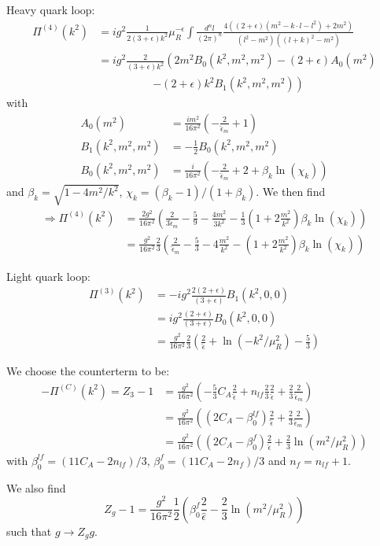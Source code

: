 Heavy quark loop:
\begin{align}
\Pi^{(4)}(k^2) &= ig^2\frac {1} {2(3+\epsilon)k^2}\mu_R^{-\epsilon}\!\!\int\!\!\frac{d^nl}{(2\pi)^n} \frac{4((2+\epsilon)(m^2-k\cdot l - l^2)+2m^2)}{(l^2-m^2)((l+k)^2-m^2)}\\
 &= ig^2\frac {2}{(3+\epsilon)k^2}\left(2m^2B_0(k^2,m^2,m^2)-(2+\epsilon)A_0(m^2)\right.\nonumber\\
 &\hspace{60pt}\left.-(2+\epsilon)k^2B_1(k^2,m^2,m^2)\right)
\end{align}
with
\begin{align}
A_0(m^2) &= \frac {i m^2}{16\pi^2}\left(-\frac 2 {\hat \epsilon_m} + 1 \right)\\
B_1(k^2,m^2,m^2) &= -\frac 1 2 B_0(k^2,m^2,m^2)\\
B_0(k^2,m^2,m^2) &= \frac i {16\pi^2}\left(-\frac 2 {\hat \epsilon_m} + 2 + \beta_k\ln(\chi_k) \right)
\end{align}
and $\beta_k=\sqrt{1-4m^2/k^2}$, $\chi_k=(\beta_k-1)/(1+\beta_k)$. We then find
\begin{align}
\Rightarrow \Pi^{(4)}(k^2) &= \frac {2g^2}{16\pi^2}\left(\frac 2 {3\hat \epsilon_m}-\frac 5 9 -\frac{4m^2}{3k^2} - \frac 1 3 \left(1+2\frac{m^2}{k^2}\right)\beta_k\ln(\chi_k)\right)\\
&= \frac {g^2}{16\pi^2}\frac 2 3\left(\frac 2 {\hat \epsilon_m}-\frac 5 3 -4\frac{m^2}{k^2} - \left(1+2\frac{m^2}{k^2}\right)\beta_k\ln(\chi_k)\right)
\end{align}

Light quark loop:
\begin{align}
\Pi^{(3)}(k^2) &= -ig^2\frac {2(2+\epsilon)}{(3+\epsilon)}B_1(k^2,0,0)\\
 &= ig^2\frac {(2+\epsilon)}{(3+\epsilon)}B_0(k^2,0,0)\\
 &=\frac{g^2}{16\pi^2}\frac 2 3\left(\frac 2 {\hat \epsilon} + \ln(-k^2/\mu_R^2)-\frac 5 3\right)
\end{align}

We choose the counterterm to be:
\begin{align}
-\Pi^{(C)}(k^2)=Z_3-1 &= \frac{g^2}{16\pi^2}\left(-\frac 5 3 C_A \frac 2 {\hat \epsilon} + n_{lf}\frac 2 3 \frac 2 {\hat \epsilon} + \frac 2 3 \frac 2 {\hat \epsilon_m}\right)\\
 &= \frac{g^2}{16\pi^2}\left( (2C_A-\beta_0^{lf})\frac 2 {\hat\epsilon}+ \frac 2 3 \frac 2 {\hat \epsilon_m} \right)\\
 &= \frac{g^2}{16\pi^2}\left( (2C_A-\beta_0^f)\frac 2 {\hat\epsilon}+ \frac 2 3 \ln(m^2/\mu_R^2) \right)
\end{align}
with $\beta_0^{lf} = (11C_A-2n_{lf})/3$, $\beta_0^f = (11C_A-2n_{f})/3$ and $n_f=n_{lf}+1$.

We also find
\begin{equation}
Z_g -1 = \frac{g^2}{16\pi^2}\frac 1 2\left(\beta_0^f\frac 2 {\hat\epsilon} - \frac 2 3 \ln(m^2/\mu_R^2) \right)
\end{equation}
such that $g\rightarrow Z_g g$.
